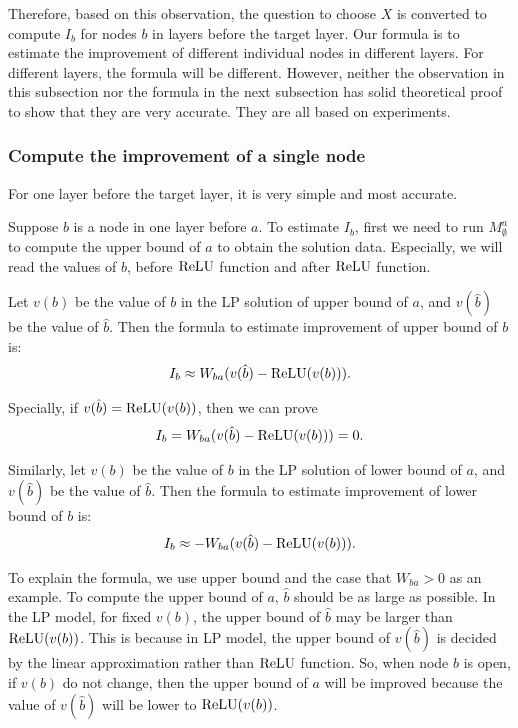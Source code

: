 Therefore, based on this observation, the question to choose $X$ is converted to compute $I_b$ for nodes $b$ in layers before the target layer. Our formula is to estimate the improvement of different individual nodes in different layers. For different layers, the formula will be different.  However, neither the observation in this subsection nor the formula in the next subsection has solid theoretical proof to show that they are very accurate. They are all based on experiments. 

\subsubsection*{Compute the improvement of a single node}


For one layer before the target layer, it is very simple and most accurate. 

Suppose $b$ is a node in one layer before $a$. To estimate $I_b$, first we need to run $M^a_{\emptyset}$ to compute the upper bound of $a$  to obtain the solution data. Especially, we will read the values of $b$, before $\mathrm{ReLU}$ function and after $\mathrm{ReLU}$ function.

\begin{definition}
	Let $v(b)$ be the value of $b$ in the LP solution of upper bound of $a$, and $v(\hat{b})$ be the value of $\hat{b}$.	Then the formula to estimate improvement of upper bound of $b$ is: \begin{align*}
		I_b \approx W_{ba}(v(\hat{b})-\mathrm{ReLU}(v(b))).
	\end{align*}
	
	Specially, if $v(\hat{b})=\mathrm{ReLU}(v(b))$, then we can prove \begin{align*}
		I_b = W_{ba}(v(\hat{b})-\mathrm{ReLU}(v(b))) = 0.
	\end{align*}
	
	
	Similarly, let $v(b)$ be the value of $b$ in the LP solution of lower bound of $a$, and $v(\hat{b})$ be the value of $\hat{b}$. Then the formula to estimate improvement of lower bound of $b$ is: \begin{align*}
		I_b \approx -W_{ba}(v(\hat{b})-\mathrm{ReLU}(v(b))).
	\end{align*}
	
\end{definition}

To explain the formula, we use upper bound and the case that $W_{ba} > 0$ as an example. To compute the upper bound of $a$, $\hat{b}$ should be as large as possible. In the LP model, for fixed $v(b)$, the upper bound of $\hat{b}$ may be larger than $\mathrm{ReLU}(v(b))$. This is because in LP model, the upper bound of $v(\hat{b})$ is decided by the linear approximation rather than $\mathrm{ReLU}$ function. So, when node $b$ is open, if $v(b)$ do not change, then the upper bound of $a$ will be improved because the value of $v(\hat{b})$ will be lower to $\mathrm{ReLU}(v(b))$.
 			
